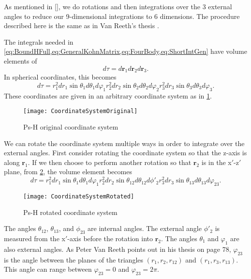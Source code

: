 \documentclass[Dissertation.tex]{subfiles}
\begin{document}
As mentioned in \cref{}, we do rotations and then integrations over the 3 
external angles to reduce our 9-dimensional integrations to 6 dimensions. The
procedure described here is the same as in Van Reeth's thesis
\cite{VanReethThesis}.

The integrals needed in
\cref{eq:BoundHFull,eq:GeneralKohnMatrix,eq:FourBody,eq:ShortIntGen} have
volume elements of
\begin{equation}
\label{eq:dTau1}
d\tau = d\textbf{r}_1 d\textbf{r}_2 d\textbf{r}_3.
\end{equation}
In spherical coordinates, this becomes
\begin{equation}
\label{eq:dTau2}
d\tau = r_1^2 dr_1 \sin\theta_1 d\theta_1 d\varphi_1 r_2^2 dr_2 \sin\theta_2
  d\theta_2 d\varphi_2 r_3^2 dr_3 \sin\theta_3 d\theta_3 d\varphi_3.
\end{equation}
These coordinates are given in an arbitrary coordinate system as in
\cref{fig:CoordinateSystemOriginal}.

\begin{figure}[H]
	\centering
	\texttt{[image: CoordinateSystemOriginal]}
	\caption{Ps-H original coordinate system}
	\label{fig:CoordinateSystemOriginal}
\end{figure}

We can rotate the coordinate system multiple ways in order to integrate over 
the external angles. First consider rotating the coordinate system so that the
z-axis is along $\textbf{r}_1$. If we then choose to perform another rotation
so that $\textbf{r}_2$ is in the x$'$-z$'$ plane, from
\cref{fig:CoordinateSystemRotated}, the volume element becomes
\begin{equation}
\label{eq:dTau3}
d\tau = r_1^2 dr_1 \sin\theta_1 d\theta_1 d\varphi_1 r_2^2 dr_2 \sin\theta_{12}
  d\theta_{12} d\phi'_2 r_3^2 dr_3 \sin\theta_{13} d\theta_{13} d\varphi_{23}.
\end{equation}
\begin{figure}[H]
	\centering
	\texttt{[image: CoordinateSystemRotated]}
	\caption{Ps-H rotated coordinate system}
	\label{fig:CoordinateSystemRotated}
\end{figure}
\noindent The angles $\theta_{12}$, $\theta_{13}$, and $\phi_{23}$ are 
internal angles. The external angle $\phi'_2$ is measured from the x$'$-axis 
before the rotation into $\textbf{r}_2$. The angles $\theta_1$ and $\varphi_1$
are also external angles.
As Peter Van Reeth points out in his thesis \cite{VanReethThesis} on page 78, 
$\varphi_{23}$ is the angle between the planes of the triangles
$(r_1,r_2,r_{12})$ and $(r_1,r_3,r_{13})$. This angle can range between
$\varphi_{23} = 0$ and $\varphi_{23} = 2 \pi$.
\end{document}
